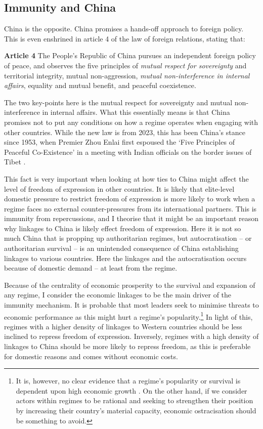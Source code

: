 \subsection{Immunity and China}
China is the opposite. China promises a hands-off approach to foreign policy. This is even enshrined in article 4 of the law of foreign relations, stating that:
\begin{displayquote}
\textbf{Article 4} The People's Republic of China pursues an independent foreign policy of peace, and observes the five principles of \textit{mutual respect for sovereignty} and territorial integrity, mutual non-aggression, \textit{mutual non-interference in internal affairs}, equality and mutual benefit, and peaceful coexistence. \citep[emphases are my own]{xinhua_law_2023}
\end{displayquote}
The two key-points here is the mutual respect for sovereignty and mutual non-interference in internal affairs. What this essentially means is that China promises not to put any conditions on how a regime operates when engaging with other countries. While the new law is from 2023, this has been China's stance since 1953, when Premier Zhou Enlai first espoused the `Five Principles of Peaceful Co-Existence' in a meeting with Indian officials on the border issues of Tibet \citep{zhonghua_renmin_gongheguo_jiaowenbu_ministry_of_foreign_affairs_of_the_peoples_republic_of_china_zhongguo_2000}.

This fact is very important when looking at how ties to China might affect the level of freedom of expression in other countries. It is likely that elite-level domestic pressure to restrict freedom of expression is more likely to work when a regime faces no external counter-pressures from its international partners. This is immunity from repercussions, and I theorise that it might be an important reason why linkages to China is likely effect freedom of expression. Here it is not so much China that is propping up authoritarian regimes, but autocratisation -- or authoritarian survival -- is an unintended consequence of China establishing linkages to various countries. Here the linkages and the autocratisation occurs because of domestic demand -- at least from the regime.

Because of the centrality of economic prosperity to the survival and expansion of any regime, I consider the economic linkages to be the main driver of the immunity mechanism. It is probable that most leaders seek to minimise threats to economic performance as this might hurt a regime's popularity.\footnote{It is, however, no clear evidence that a regime's popularity or survival is dependent upon high economic growth \citep{chu_sources_2013, stockemer_economic_2020}. On the other hand, if we consider actors within regimes to be rational and seeking to strengthen their position by increasing their country's material capacity, economic ostracisation should be something to avoid.} In light of this, regimes with a higher density of linkages to Western countries should be less inclined to repress freedom of expression. Inversely, regimes with a high density of linkages to China should be more likely to repress freedom, as this is preferable for domestic reasons and comes without economic costs. 

